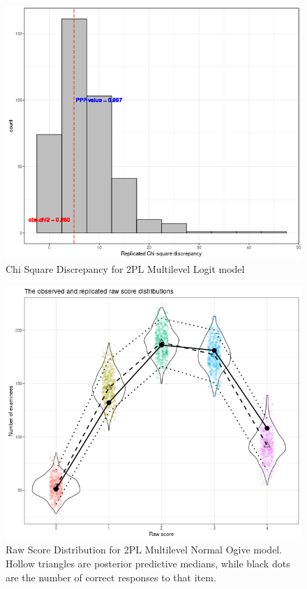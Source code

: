 \documentclass[12pt]{article}
\begin{document}
\begin{figure}[h]
\vspace{-0.5cm}
  \centering
  \includegraphics[width=1\columnwidth]{Plots/Plots_2PL_mlirt_Logit/chi_square.png}
  \caption{Chi Square Discrepancy for 2PL Multilevel Logit model}
  \label{2pl_logit_mlirt_chi_squar}
\end{figure}

\begin{figure}[h]
\vspace{-0.5cm}
  \centering
  \includegraphics[width=1\columnwidth]{Plots/Plots_2PL_mlirt_Ogive_NC/raw_score_dist.png}
  \caption{Raw Score Distribution for 2PL Multilevel Normal Ogive model. Hollow triangles are posterior predictive medians, while black dots are the number of correct responses to that item.}
  \label{2pl_ogive_nc_mlirt_raw_score}
\end{figure}
\end{document}
